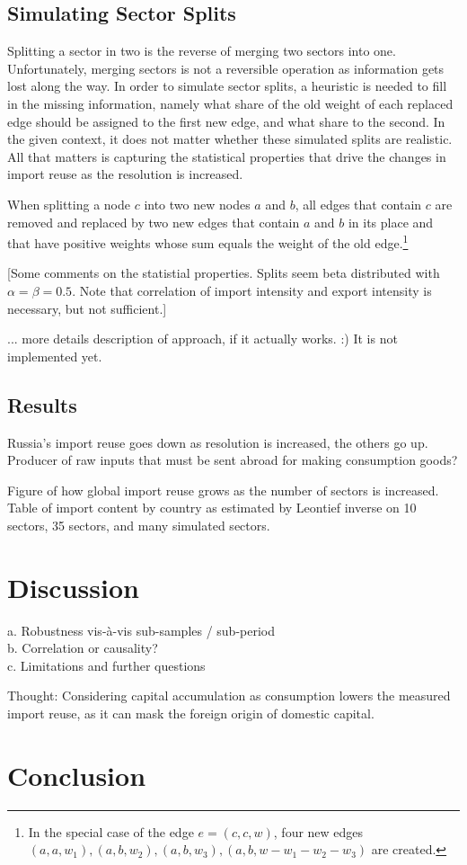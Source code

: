 \documentclass[english]{uzhpub}
\begin{document}
\subsection{Simulating Sector Splits}
Splitting a sector in two is the reverse of merging two sectors into one. Unfortunately, merging sectors is not a reversible operation as information gets lost along the way. In order to simulate sector splits, a heuristic is needed to fill in the missing information, namely what share of the old weight of each replaced edge should be assigned to the first new edge, and what share to the second. In the given context, it does not matter whether these simulated splits are realistic. All that matters is capturing the statistical properties that drive the changes in import reuse as the resolution is increased.

When splitting a node $c$ into two new nodes $a$ and $b$, all edges that contain $c$ are removed and replaced by two new edges that contain $a$ and $b$ in its place and that have positive weights whose sum equals the weight of the old edge.\footnote{In the special case of the edge $e=(c, c, w)$, four new edges $(a, a, w_1), (a, b, w_2), (a, b, w_3), (a, b, w - w_1 - w_2 - w_3)$ are created.} 

[Some comments on the statistial properties. Splits seem beta distributed with $\alpha=\beta=0.5$. Note that correlation of import intensity and export intensity is necessary, but not sufficient.]

... more details description of approach, if it actually works. :) It is not implemented yet.


\subsection{Results}

Russia's import reuse goes down as resolution is increased, the others go up. Producer of raw inputs that must be sent abroad for making consumption goods?

Figure of how global import reuse grows as the number of sectors is increased.\\
Table of import content by country as estimated by Leontief inverse on 10 sectors, 35 sectors, and many simulated sectors.\\


\section{Discussion}
a.	Robustness vis-à-vis sub-samples / sub-period\\
b.	Correlation or causality?\\
c.	Limitations and further questions

Thought: Considering capital accumulation as consumption lowers the measured import reuse, as it can mask the foreign origin of domestic capital.

\section{Conclusion}
\end{document}
